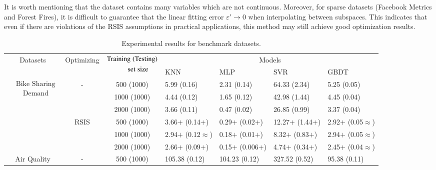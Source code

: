 \documentclass[final,3p,times]{elsarticle}
\begin{document}
It is worth mentioning that the dataset contains many variables 
which are not continuous. Moreover, for sparse datasets 
(Facebook Metrics and Forest Fires), it is difficult to guarantee 
that the linear fitting error $\varepsilon'\rightarrow0$ when 
interpolating between subspaces. This indicates that even if there 
are violations of the RSIS assumptions in practical applications, 
this method may still achieve good optimization results. 

 
 

\begin{table}
  \renewcommand{\arraystretch}{0.7}
  \caption{{Experimental} results for benchmark datasets.}\label{tab4}
  \begin{tabularx}{\textwidth}{cccXXXX}
  \toprule
  \multirow{2}{*}{Datasets} & \multirow{2}{*}{Optimizing} & \multirow{2}{*}{$\begin{aligned}&\text{Training\;(Testing)}\\&\qquad\quad\text{set\;size}\end{aligned}$} & \multicolumn{4}{c}{Models} \\ 
  \cmidrule{4-7}
    &  &  & KNN & MLP & SVR & GBDT \\
  \cmidrule{1-7}
  \multirow{6}{*}{$\begin{aligned}&\text{Bike Sharing}\\&\quad\text{Demand}\end{aligned}$} & \multirow{3}{*}{-} & 500 (1000) & 5.99 (0.16) & 2.31 (0.14) & 64.33 (2.34) & 5.25 (0.05) \\
    &  & 1000 (1000) & 4.44 (0.12) & 1.65 (0.12) & 42.98 (1.44) & 4.45 (0.04) \\
    &  & 2000 (1000) & 3.66 (0.11) & 0.47 (0.02) & 26.85 (0.99) & 3.37 (0.04) \\
  \cmidrule{2-7}
    & \multirow{3}{*}{RSIS} & 500 (1000) & 3.66$+$ (0.14$+$) & 0.29$+$ (0.02$+$) & 12.27$+$ (1.44$+$) & 2.92$+$ (0.05$\approx$) \\
    &  & 1000 (1000) & 2.94$+$ (0.12$\approx$) & 0.18$+$ (0.01$+$) & 8.32$+$ (0.83$+$) & 2.94$+$ (0.05$\approx$) \\
    &  & 2000 (1000) & 2.66$+$ (0.09$+$) & 0.15$+$ (0.006$+$) & 4.74$+$ (0.34$+$) & 2.45$+$ (0.04$\approx$) \\
  \cmidrule{1-7}
  \multirow{6}{*}{Air Quality} & \multirow{3}{*}{-} & 500 (1000) & 105.38 (0.12) & 104.23 (0.12) & 327.52 (0.52) & 95.38 (0.11) \\

\end{tabularx}
\end{table}
\end{document}
